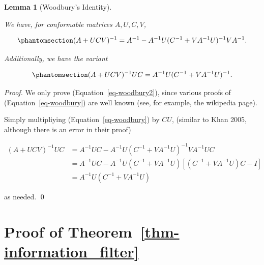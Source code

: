 \documentclass[
]{report}
\theoremstyle{plain}
\theoremstyle{plain}
\theoremstyle{plain}
\newtheorem{lemma}{Lemma}[section]
\theoremstyle{remark}
\begin{document}
\begin{lemma}[Woodbury's
Identity]\protect\hypertarget{lem-woodbury}{}\label{lem-woodbury}

We have, for conformable matrices \(A, U, C, V\),

\begin{equation}\phantomsection\label{eq-woodbury}{\begin{split}
(A + UCV)^{-1} = A^{-1} - A^{-1} U (C^{-1} + VA^{-1}U)^{-1}VA^{-1}.
\end{split}
}\end{equation}

Additionally, we have the variant

\begin{equation}\phantomsection\label{eq-woodbury2}{\begin{split}
(A + UCV)^{-1}UC = A^{-1} U(C^{-1} + VA^{-1}U)^{-1}.
\end{split}
}\end{equation}

\end{lemma}

\begin{proof}
We only prove (Equation~\ref{eq-woodbury2}), since various proofs of
(Equation~\ref{eq-woodbury}) are well known (see, for example, the
wikipedia page).

Simply multipliying (Equation~\ref{eq-woodbury}) by \(CU\), (similar to
Khan 2005, although there is an error in their proof)

\[\begin{split}
(A+UCV)^{-1}UC &= A^{-1}UC - A^{-1}U(C^{-1} + VA^{-1}U)^{-1}VA^{-1}UC\\
&= A^{-1}UC - A^{-1}U(C^{-1} + VA^{-1}U) [(C^{-1} +VA^{-1}U)C - I]\\
&= A^{-1}U(C^{-1}+VA^{-1}U)
\end{split}
\]

as needed. \qed
\end{proof}

\section{\texorpdfstring{Proof of
Theorem~\ref{thm-information_filter}}{Proof of Theorem~}}\label{sec-app1}
\end{document}
